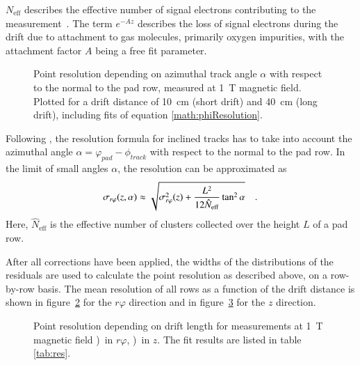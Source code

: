 \documentclass[preprint]{elsarticle}
\begin{document}
$N_{\mathrm{eff}}$ describes the effective number of signal electrons contributing to the measurement~\cite{YonamineJinst2014}. The term $e^{-Az}$ describes the loss of signal electrons during the drift due to attachment to gas molecules, primarily oxygen impurities, with the attachment factor $A$ being a free fit parameter. 



\begin{figure}[b!]
\centering
\iftoggle{blackandwhite}{\texttt{[image: figures/PhiXYResolutionBFieldBW.pdf]}}{\texttt{[image: figures/PhiXYResolutionBField.pdf]}}
\caption{\small Point resolution depending on azimuthal track angle $\alpha$ with respect to the normal to the pad row, measured at \SI{1}{\tesla} magnetic field. Plotted for a drift distance of \SI{10}{\cm} (short drift) and \SI{40}{\cm} (long drift), including fits of equation \eqref{math:phiResolution}.}
\label{fig:restheta}
\end{figure}

Following \cite{Blum:2008,YonamineJinst2014}, the resolution formula for inclined tracks has to take into account the azimuthal angle $\alpha = {\varphi}_{pad} - {\phi}_{track}$ with respect to the normal to the pad row. In the limit of small angles $\alpha$, the resolution can be approximated as
\begin{equation}
  \sigma_{r\varphi}(z,\alpha) \approx \sqrt{\sigma_{r\varphi}^2(z)+\frac{L^2}{12\hat{N}_{\mathrm{eff}}}\tan^2\alpha} \quad .\\
 \label{math:phiResolution}
\end{equation}
Here, $\hat{N}_{\mathrm{eff}}$ is the effective number of clusters collected over the height $L$ of a pad row.

After all corrections have been applied, the widths of the distributions of the residuals are used to calculate the point resolution as described above, on a row-by-row basis. 
The mean resolution of all rows as a function of the drift distance is shown in figure~\ref{sfig:resrphi} for the $r\varphi$ direction and in figure~\ref{sfig:resz} for the $z$ direction. 

\begin{figure}[b!]
\begin{subfigure}[b]{0.48\textwidth}
\iftoggle{blackandwhite}{\texttt{[image: figures/xyResolutionPaper1TBW.pdf]}}{\texttt{[image: figures/xyResolutionPaper1T.pdf]}}
\caption{}
\label{sfig:resrphi}
\end{subfigure}
\hfill
\begin{subfigure}[b]{0.48\textwidth}
\iftoggle{blackandwhite}{\texttt{[image: figures/zResolutionPaper1TBW.pdf]}}{\texttt{[image: figures/zResolutionPaper1T.pdf]}}
\caption{}
\label{sfig:resz}
\end{subfigure}
\caption{\small Point resolution depending on drift length for measurements at \SI{1}{\tesla} magnetic field \protect{})~in $r\varphi$, \protect{})~in $z$. The fit results are listed in table \ref{tab:res}.}
\label{fig:resolution}
\end{figure}
\end{document}
